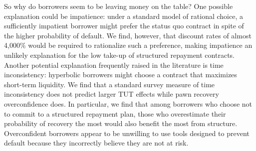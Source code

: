 \documentclass[12pt, a4paper, colorinlistoftodos]{article}
\begin{document}






So why do borrowers seem to be leaving money on the table?
One possible explanation could be impatience: under a standard model of rational choice, a sufficiently impatient borrower might prefer the status quo contract in spite of the higher probability of default.
We find, however, that discount rates of almost 4,000\% would be required to rationalize such a preference, making impatience an unlikely explanation for the low take-up of structured repayment contracts. Another potential explanation frequently raised in the literature is time inconsistency: hyperbolic borrowers might choose a contract that maximizes short-term liquidity.  We find that a standard survey measure of time inconsistency does not predict larger TUT effects while pawn recovery overconfidence does. In particular, we find that among borrowers who choose not to commit to a structured repayment plan, those who overestimate their probability of recovery the most would also benefit the most from structure. Overconfident borrowers appear to be unwilling to use tools designed to prevent default because they incorrectly believe they are not at risk.
\end{document}
